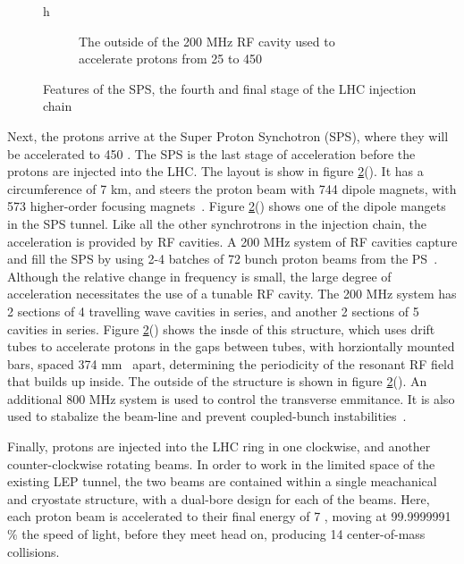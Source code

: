 \begin{figure}{h}
\begin{subfigure}[h]{0.45\textwidth}
        \caption{The outside of the 200 MHz RF cavity used to
          accelerate protons from 25 to 450 \GeV }\label{fig:sps_rf_outside}
      \end{subfigure}
       \caption{Features of the SPS, the fourth and final stage of
        the LHC injection chain}\label{fig:sps}
\end{figure}

\par Next, the protons arrive at the Super Proton Synchotron (SPS), where
they will be accelerated to 450 \GeV.  The SPS is the last stage of acceleration
before the protons are injected into the LHC.  The layout is show in
figure \ref{fig:sps}().  It has a circumference
of 7 km, and steers the proton beam with 744 dipole magnets, with 573
higher-order focusing magnets~\cite{LHC:LHC_sps_cern_website}.  Figure
\ref{fig:sps}() shows one of the dipole
mangets in the SPS tunnel.  Like all the other synchrotrons in the
injection chain, the acceleration is provided by RF cavities.  A 200
MHz system of RF cavities capture and fill the SPS by using 2-4
batches of 72 bunch proton beams from the
PS~\cite{LHC:TDR_Vol3_InjectionChain_Benedikt}.  Although the relative
change in frequency is small, the large degree of acceleration
necessitates the use of a tunable RF cavity.  The 200 MHz system has 2
sections of 4 travelling wave cavities in series, and another 2
sections of 5 cavities in series.  Figure
\ref{fig:sps}() shows the insde of this
structure, which uses drift tubes to accelerate protons in the gaps
between tubes, with horziontally mounted bars, spaced 374
mm~\cite{LHC:LHC_SPS_200MHzRF_Dôme} apart, determining the periodicity
of the resonant RF field that builds up inside.  The outside of the
structure is shown in figure
\ref{fig:sps}().  An additional 800 MHz
system is used to control the transverse emmitance.  It is also used
to stabalize the beam-line and prevent coupled-bunch
instabilities~\cite{LHC:TDR_Vol3_InjectionChain_Benedikt}.  

\par Finally, protons are injected into the LHC ring in one clockwise,
and another counter-clockwise rotating beams.  In order to work in the
limited space of the existing LEP tunnel, the two beams are contained
within a single meachanical and cryostate structure, with a dual-bore
design for each of the beams.  Here, each proton beam is
accelerated to their final energy of 7 \TeV, moving at 99.9999991$\%$
the speed of light, before they meet head on, producing 14 \TeV
center-of-mass collisions.  

